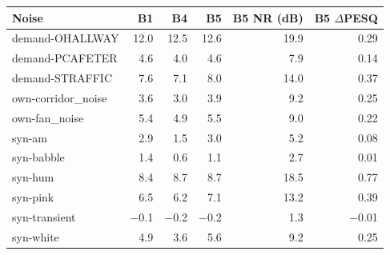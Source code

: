 \begin{tabular}{lrrrrr}
\toprule
Noise & B1 & B4 & B5 & B5 NR (dB) & B5 $\Delta$PESQ \\
\midrule
demand-OHALLWAY & 12.0 & 12.5 & 12.6 & 19.9 & 0.29 \\
demand-PCAFETER & 4.6 & 4.0 & 4.6 & 7.9 & 0.14 \\
demand-STRAFFIC & 7.6 & 7.1 & 8.0 & 14.0 & 0.37 \\
own-corridor\_noise & 3.6 & 3.0 & 3.9 & 9.2 & 0.25 \\
own-fan\_noise & 5.4 & 4.9 & 5.5 & 9.0 & 0.22 \\
syn-am & 2.9 & 1.5 & 3.0 & 5.2 & 0.08 \\
syn-babble & 1.4 & 0.6 & 1.1 & 2.7 & 0.01 \\
syn-hum & 8.4 & 8.7 & 8.7 & 18.5 & 0.77 \\
syn-pink & 6.5 & 6.2 & 7.1 & 13.2 & 0.39 \\
syn-transient & $-$0.1 & $-$0.2 & $-$0.2 & 1.3 & $-$0.01 \\
syn-white & 4.9 & 3.6 & 5.6 & 9.2 & 0.25 \\
\bottomrule
\end{tabular}
